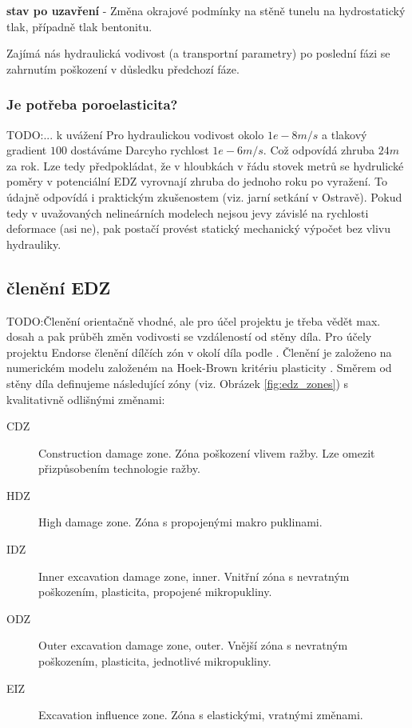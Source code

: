\documentclass{article}
\def\todo#1{{TODO:\color{red}#1}}
\begin{document}
{\bf stav po uzavření} - Změna okrajové podmínky na stěně tunelu na hydrostatický tlak, případně tlak bentonitu.
                         
Zajímá nás hydraulická vodivost (a transportní parametry) po poslední fázi se zahrnutím poškození 
v důsledku předchozí fáze.

\subsubsection{Je potřeba poroelasticita?}
\todo{... k uvážení}
Pro hydraulickou vodivost okolo $1e-8 m/s$ a tlakový gradient $100$ dostáváme Darcyho rychlost 
$1e-6 m/s$. Což odpovídá zhruba $24m$ za rok. Lze tedy předpokládat, že v hloubkách v řádu 
stovek metrů se hydrulické poměry v potenciální EDZ vyrovnají zhruba do jednoho roku po vyražení. 
To údajně odpovídá i praktickým zkušenostem (viz. jarní setkání v Ostravě). 
Pokud tedy v uvažovaných nelineárních modelech nejsou jevy závislé na rychlosti deformace (asi ne),
pak postačí provést statický mechanický výpočet bez vlivu hydrauliky.

\subsection{členění EDZ}
\todo{Členění orientačně vhodné, ale pro účel projektu je třeba vědět max. dosah a pak průběh změn vodivosti se vzdáleností od stěny díla.}
Pro účely projektu Endorse členění dílčích zón v okolí díla podle 
\cite{Perras2016}. Členění je založeno na numerickém modelu založeném na Hoek-Brown kritériu plasticity \cite{Hoek2002}. Směrem od stěny díla definujeme následující zóny (viz. Obrázek \ref{fig:edz_zones}) 
s kvalitativně odlišnými změnami:
\begin{description}
\item[CDZ] Construction damage zone. Zóna poškození vlivem ražby. Lze omezit přizpůsobením technologie ražby.
\item[HDZ] High damage zone. Zóna s propojenými makro puklinami. 
\item[IDZ] Inner excavation damage zone, inner. Vnitřní zóna s nevratným poškozením, plasticita, propojené mikropukliny.
\item[ODZ] Outer excavation damage zone, outer. Vnější zóna s nevratným poškozením, plasticita, jednotlivé mikropukliny.
\item[EIZ] Excavation influence zone. Zóna s elastickými, vratnými změnami.
\end{description}
\end{document}
